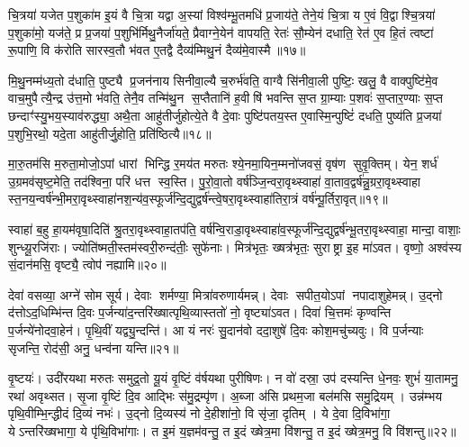 {\anuvakamend[{अ॒मृत॑म॒ष्टात्रिꣳ॑शच्च॥५॥}]}

चि॒त्रया॑ यजेत प॒शुका॑म इ॒यं वै चि॒त्रा यद्वा अ॒स्यां विश्व॑म्भू॒तमधि॑ प्र॒जाय॑ते॒ तेने॒यं चि॒त्रा य ए॒वं वि॒द्वाश्चि॒त्रया॑ प॒शुका॑मो॒ यज॑ते॒ प्र प्र॒जया॑ प॒शुभि॑र्मिथु॒नैर्जा॑यते॒ प्रैवाग्ने॒येन॑ वापयति॒ रेतः॑ सौ॒म्येन॑ दधाति॒ रेत॑ ए॒व हि॒तं त्वष्टा॑ रू॒पाणि॒ वि क॑रोति सारस्व॒तौ भ॑वत ए॒तद्वै दैव्य॑म्मिथु॒नं दैव्य॑मे॒वास्मै॥१७॥

मि॒थु॒नम्म॑ध्य॒तो द॑धाति॒ पुष्ट्यै प्र॒जन॑नाय सिनीवा॒ल्यै च॒रुर्भ॑वति॒ वाग्वै सि॑नीवा॒ली पुष्टिः॒ खलु॒ वै वाक्पुष्टि॑मे॒व वाच॒मुपैत्यै॒न्द्र उ॑त्त॒मो भ॑वति॒ तेनै॒व तन्मि॑थु॒न स॒प्तैतानि॑ ह॒वीषि॑ भवन्ति स॒प्त ग्रा॒म्याः प॒शवः॑ स॒प्तार॒ण्याः स॒प्त छन्दाꣳ॑स्यु॒भय॒स्याव॑रुद्ध्या॒ अथै॒ता आहु॑तीर्जुहोत्ये॒ते वै दे॒वाः पुष्टि॑पतय॒स्त ए॒वास्मि॒न्पुष्टिं॑ दधति॒ पुष्य॑ति प्र॒जया॑ प॒शुभि॒रथो॒ यदे॒ता आहु॑तीर्जु॒होति॒ प्रति॑ष्ठित्यै॥१८॥

{\anuvakamend[{अ॒स्मै॒ त ए॒व द्वाद॑श च॥६॥}]}

मा॒रु॒तम॑सि म॒रुता॒मोजो॒ऽपां धारां भिन्द्धि र॒मय॑त मरुतः श्ये॒नमा॒यिन॒म्मनो॑जवसं॒ वृष॑ण सुवृ॒क्तिम्। येन॒ शर्ध॑ उ॒ग्रमव॑सृष्ट॒मेति॒ तद॑श्विना॒ परि॑ धत्त स्व॒स्ति। पु॒रो॒वा॒तो वर्\mbox{}ष॑ञ्जि॒न्वरा॒वृथ्स्वाहा॑ वा॒ताव॒द्वर्\mbox{}ष॑न्नु॒ग्ररा॒वृथ्स्वाहा स्त॒नय॒न्वर्\mbox{}ष॑न्भी॒मरा॒वृथ्स्वाहा॑नश॒न्य॑व॒स्फूर्ज॑न्दि॒द्युद्वर्\mbox{}ष॑न्त्वे॒षरा॒वृथ्स्वाहा॑तिरा॒त्रं वर्\mbox{}ष॑न्पू॒र्तिरा॒वृत्॥१९॥

स्वाहा॑ ब॒हु हा॒यम॑वृषा॒दिति॑ श्रु॒तरा॒वृथ्स्वाहा॒तप॑ति॒ वर्\mbox{}ष॑न्वि॒राडा॒वृथ्स्वाहा॑व॒स्फूर्ज॑न्दि॒द्युद्वर्\mbox{}ष॑न्भू॒तरा॒वृथ्स्वाहा॒ मान्दा॒ वाशाः॒ शुन्ध्यू॒रजि॑राः। ज्योति॑ष्मती॒स्तम॑स्वरी॒रुन्द॑तीः॒ सुफे॑नाः। मित्र॑भृतः॒ ख्षत्र॑भृतः॒ सुराष्ट्रा इ॒ह मा॑ऽवत। वृष्णो॒ अश्व॑स्य सं॒दान॑मसि॒ वृष्ट्यै॒ त्वोप॑ नह्यामि॥२०॥

{\anuvakamend[{पू॒र्तिरा॒वृद्द्विच॑त्वारिशच्च॥७॥}]}

देवा॑ वसव्या॒ अग्ने॑ सोम सूर्य। देवाः शर्मण्या॒ मित्रा॑वरुणार्यमन्न्। देवाः सपीत॒योऽपां नपादाशुहेमन्न्। उ॒द्नो द॑त्तोऽद॒धिम्भि॑न्त दि॒वः प॒र्जन्या॑द॒न्तरि॑ख्षात्पृथि॒व्यास्ततो॑ नो॒ वृष्ट्या॑ऽवत। दिवा॑ चि॒त्तमः॑ कृण्वन्ति प॒र्जन्ये॑नोदवा॒हेन॑। पृ॒थि॒वीं यद्व्यु॒न्दन्ति॑। आ यं नरः॑ सु॒दान॑वो ददा॒शुषे॑ दि॒वः कोश॒मचु॑च्यवुः। वि प॒र्जन्याः सृजन्ति॒ रोद॑सी॒ अनु॒ धन्व॑ना यन्ति॥२१॥

वृ॒ष्टयः॑। उदी॑रयथा मरुतः समुद्र॒तो यू॒यं वृ॒ष्टिं व॑र्\mbox{}षयथा पुरीषिणः। न वो॑ दस्रा॒ उप॑ दस्यन्ति धे॒नवः॒ शुभं॑ या॒तामनु॒ रथा॑ अवृथ्सत। सृ॒जा वृ॒ष्टिं दि॒व आद्भिः स॑मु॒द्रम्पृ॑ण। अ॒ब्जा अ॑सि प्रथम॒जा बल॑मसि समु॒द्रियम्। उन्न॑म्भय पृथि॒वीम्भि॒न्द्धीदं दि॒व्यं नभः॑। उ॒द्नो दि॒व्यस्य॑ नो दे॒हीशा॑नो॒ वि सृ॑जा॒ दृतिम्। ये दे॒वा दि॒विभा॑गा॒ येऽन्तरि॑ख्षभागा॒ ये पृ॑थि॒विभा॑गाः। त इ॒मं य॒ज्ञम॑वन्तु॒ त इ॒दं ख्षेत्र॒मा वि॑शन्तु॒ त इ॒दं ख्षेत्र॒मनु॒ वि वि॑शन्तु॥२२॥

